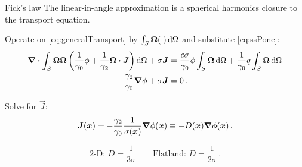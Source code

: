 \documentclass[draft]{beamer}
\begin{document}
\begin{frame}{Fick's law}
The linear-in-angle approximation is a spherical harmonics closure to the
transport equation.

Operate on \eqref{eq:generalTransport} by $\int_S \bm{\Omega} (\cdot)
\mathop{}\!\mathrm{d}\Omega$ and substitute \eqref{eq:ssPone}:
\begin{align*}
  \bm{\nabla} \bm{\cdot} \int_S \bm{\Omega} \bm{\Omega} \left(
  \frac{1}{\gamma_0}\phi + \frac{1}{\gamma_2} \bm{\Omega} \bm{\cdot} \bm{J}
  \right)
  \mathop{}\!\mathrm{d}\Omega
  + \sigma \bm{J}
  &=
  \frac{c\sigma}{\gamma_0} \phi \int_S \bm{\Omega} \mathop{}\!\mathrm{d}\Omega
  + \frac{1}{\gamma_0} q \int_S \bm{\Omega} \mathop{}\!\mathrm{d}\Omega
  \\
  \frac{\gamma_2}{\gamma_0} \bm{\nabla} \phi + \sigma \bm{J} &= 0 \,.
\end{align*}

Solve for $\vec{J}$:
\begin{equation} \label{eq:fickGeneral}
  \bm{J}(\bm{x})
  = - \frac{\gamma_2}{\gamma_0} \frac{1}{\sigma(\bm{x})} \bm{\nabla} \phi(\bm{x})
  \equiv -D(\bm{x}) \bm{\nabla} \phi(\bm{x})\,.
\end{equation}

\begin{equation*}
  \text{2-D: } D = \frac{1}{3\sigma} \qquad
  \text{Flatland: } D = \frac{1}{2\sigma}\,.
\end{equation*}
\end{frame}

\end{document}
